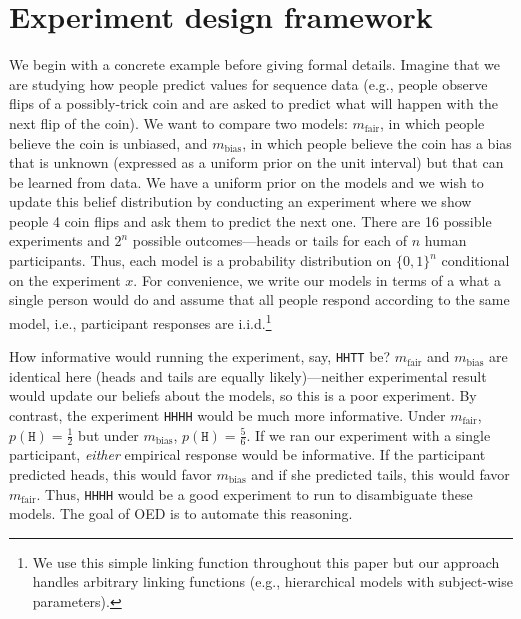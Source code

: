 \documentclass{article}
\begin{document}
\section{Experiment design framework}
\label{s:bayes}
We begin with a concrete example before giving formal details.
Imagine that we are studying how people predict values for sequence data (e.g., people observe flips of a possibly-trick coin and are asked to predict what will happen with the next flip of the coin).
We want to compare two models: $m_{\text{fair}}$, in which people believe the coin is unbiased, and $m_{\text{bias}}$, in which people believe the coin has a bias that is unknown (expressed as a uniform prior on the unit interval) but that can be learned from data.
We have a uniform prior on the models and we wish to update this belief distribution by conducting an experiment where we show people 4 coin flips and ask them to predict the next one.
There are 16 possible experiments and $2^n$ possible outcomes---heads or tails for each of $n$ human participants.
Thus, each model is a probability distribution on $\{0,1\}^n$ conditional on the experiment $x$.
For convenience, we write our models in terms of a what a single person would do and assume that all people respond according to the same model, i.e., participant responses are i.i.d.\footnote{We use this simple linking function throughout this paper but our approach handles arbitrary linking functions (e.g., hierarchical models with subject-wise parameters).}

How informative would running the experiment, say, \lstinline{HHTT} be?
$m_{\text{fair}}$ and $m_{\text{bias}}$ are identical here (heads and tails are equally likely)---neither experimental result would update our beliefs about the models, so this is a poor experiment.
By contrast, the experiment \lstinline{HHHH} would be much more informative.
Under $m_{\text{fair}}$, $p(\texttt{H}) = \frac{1}{2}$ but under $m_{\text{bias}}$, $p(\texttt{H}) = \frac{5}{6}$.
If we ran our experiment with a single participant, \emph{either} empirical response would be informative.
If the participant predicted heads, this would favor $m_{\text{bias}}$ and if she predicted tails, this would favor $m_{\text{fair}}$.
Thus, \lstinline{HHHH} would be a good experiment to run to disambiguate these models.
The goal of OED is to automate this reasoning.
\end{document}

